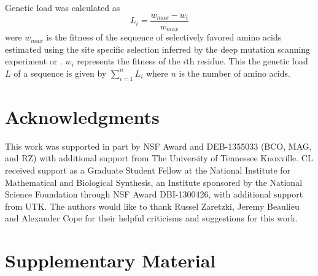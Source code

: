 \documentclass[12pt]{article}
\begin{document}
Genetic load was calculated as
\begin{equation}
L_i = \frac{w_{max} - w_i}{w_{max}}
\end{equation}
were $w_{max}$ is the fitness of the sequence of selectively favored amino acids estimated using  the site specific selection inferred by the deep mutation scanning experiment or \selac.
$w_i$ represents the fitness of the $i$th residue.
This the genetic load $L$ of a sequence is given by $\sum_{i=1}^n L_i$ where $n$ is the number of amino acids.

\section*{Acknowledgments}

This work was supported in part by NSF Award and DEB-1355033 (BCO, MAG, and RZ) with additional support from The University of Tennessee Knoxville. 
CL received support as a Graduate Student Fellow at the National Institute for Mathematical and Biological Synthesis, an Institute sponsored by the National Science Foundation through NSF Award DBI-1300426, with additional support from UTK. 
The authors would like to thank Russel Zaretzki, Jeremy Beaulieu and Alexander Cope for their helpful criticisms and suggestions for this work.







\clearpage
\beginsupplement
\section*{Supplementary Material}
\end{document}

